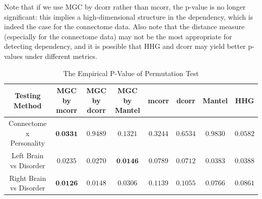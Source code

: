 \documentclass[11pt]{article}
\begin{document}
Note that if we use MGC by dcorr rather than mcorr, the p-value is no longer significant: this implies a high-dimensional structure in the dependency, which is indeed the case for the connectome data. Also note that the distance measure (especially for the connectome data) may not be the most appropriate for detecting dependency, and it is possible that HHG and dcorr may yield better p-values under different metrics.

\begin{table}[!t]
\footnotesize
\renewcommand{\arraystretch}{0.5}
\centering
{\begin{tabular}{|c||c|c|c|c|c|c|c|}
\hline
Testing Method & MGC by mcorr & MGC by dcorr & MGC by Mantel & mcorr & dcorr & Mantel & HHG \\
\hline
Connectome x Personality & $\textbf{0.0331}$ & $0.9489$  & $0.1321$ & $0.3244$ & $0.6534$ & $0.9830$  & $0.0582$ \\
\hline
Left Brain vs Disorder  & $0.0235$ & $0.0270$ & $\textbf{0.0146}$ & $0.0789$ & $0.0712$ & $0.0383$ & $0.0388$ \\
\hline
Right Brain vs Disorder & $\textbf{0.0126}$ & $0.0148$  & $0.0306$ & $0.1139$ & $0.1055$  & $0.0766$ & $0.0861$\\
\hline
\end{tabular}
\caption{The Empirical P-Value of Permutation Test}
\label{table1}
}
\end{table}
\end{document}

